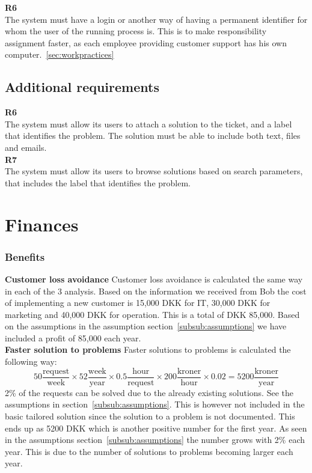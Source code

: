 \textbf{R6} \\
The system must have a login or another way of having a permanent identifier for whom the user of the running process is. This is to make responsibility assignment faster, as each employee providing customer support has his own computer.~\ref{sec:workpractices}

\subsection{Additional requirements}
\label{sub:additional_requirements}
\textbf{R6} \\
The system must allow its users to attach a solution to the ticket, and a label that identifies the problem. The solution must be able to include both text, files and emails. \\

\textbf{R7} \\
The system must allow its users to browse solutions based on search parameters, that includes the label that identifies the problem.

\section{Finances}
\label{sec:finances}
\subsubsection{Benefits}
\textbf{Customer loss avoidance}
Customer loss avoidance is calculated the same way in each of the 3 analysis. Based on the information\cite{bob004} we received from Bob the cost of implementing a new customer is 15,000 DKK for IT, 30,000 DKK for marketing and 40,000 DKK for operation. This is a total of DKK 85,000. Based on the assumptions in the assumption section~\ref{subsub:assumptions} we have included a profit of 85,000 each year. \\

\textbf{Faster solution to problems}
Faster solutions to problems is calculated the following way:
\[ 50 \frac{\mathrm{request}}{\mathrm{week}} \times 52 \frac{\mathrm{week}}{\mathrm{year}} \times 0.5 \frac{\mathrm{hour}}{\mathrm{request}} \times 200 \frac{\mathrm{kroner}}{\mathrm{hour}} \times 0.02 = 5200 \frac{\mathrm{kroner}}{\mathrm{year}} \]
2\% of the requests can be solved due to the already existing solutions. See the assumptions in section~\ref{subsub:assumptions}.
This is however not included in the basic tailored solution since the solution to a problem is not documented.
This ends up as 5200 DKK which is another positive number for the first year. As seen in the assumptions section~\ref{subsub:assumptions} the number grows with 2\% each year. This is due to the number of solutions to problems becoming larger each year.\\

